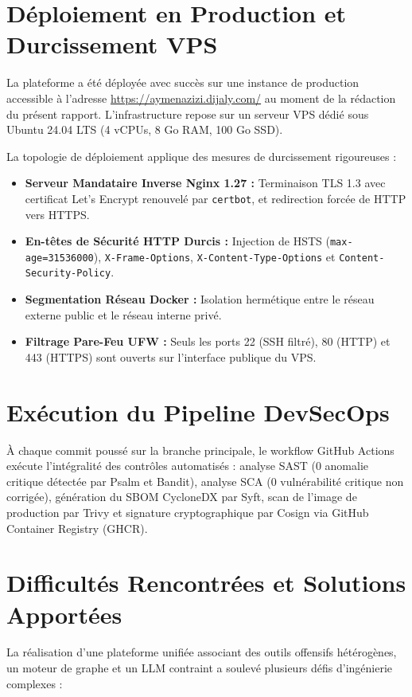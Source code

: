 \section{D\'eploiement en Production et Durcissement VPS}
\par La plateforme a \'et\'e d\'eploy\'ee avec succ\`es sur une instance de production accessible \`a l'adresse \url{https://aymenazizi.dijaly.com/} au moment de la r\'edaction du pr\'esent rapport. L'infrastructure repose sur un serveur VPS d\'edi\'e sous Ubuntu 24.04 LTS (4 vCPUs, 8 Go RAM, 100 Go SSD).
\par La topologie de d\'eploiement applique des mesures de durcissement rigoureuses :
\begin{itemize}
    \item \textbf{Serveur Mandataire Inverse Nginx 1.27 :} Terminaison TLS 1.3 avec certificat Let's Encrypt renouvel\'e par \texttt{certbot}, et redirection forc\'ee de HTTP vers HTTPS.
    \item \textbf{En-t\^etes de S\'ecurit\'e HTTP Durcis :} Injection de HSTS (\texttt{max-age=31536000}), \texttt{X-Frame-Options}, \texttt{X-Content-Type-Options} et \texttt{Content-Security-Policy}.
    \item \textbf{Segmentation R\'eseau Docker :} Isolation herm\'etique entre le r\'eseau externe public et le r\'eseau interne priv\'e.
    \item \textbf{Filtrage Pare-Feu UFW :} Seuls les ports 22 (SSH filtr\'e), 80 (HTTP) et 443 (HTTPS) sont ouverts sur l'interface publique du VPS.
\end{itemize}

\section{Ex\'ecution du Pipeline DevSecOps}
\par \`A chaque commit pouss\'e sur la branche principale, le workflow GitHub Actions ex\'ecute l'int\'egralit\'e des contr\^oles automatis\'es : analyse SAST (0 anomalie critique d\'etect\'ee par Psalm et Bandit), analyse SCA (0 vuln\'erabilit\'e critique non corrig\'ee), g\'en\'eration du SBOM CycloneDX par Syft, scan de l'image de production par Trivy et signature cryptographique par Cosign via GitHub Container Registry (GHCR).

\section{Difficult\'es Rencontr\'ees et Solutions Apport\'ees}
\par La r\'ealisation d'une plateforme unifi\'ee associant des outils offensifs h\'et\'erog\`enes, un moteur de graphe et un LLM contraint a soulev\'e plusieurs d\'efis d'ing\'enierie complexes :


